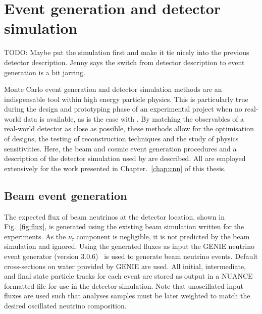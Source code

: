 \section{Event generation and detector simulation} %
\label{sec:chips_monte_carlo} %

TODO: Maybe put the simulation first and make it tie nicely into the previous detector
description. Jenny says the switch from detector description to event generation is a bit jarring.

Monte Carlo event generation and detector simulation methods are an indispensable tool within high
energy particle physics. This is particularly true during the design and prototyping phase of an
experimental project when no real-world data is available, as is the case with \chips. By matching
the observables of a real-world detector as close as possible, these methods allow for the
optimisation of designs, the testing of reconstruction techniques and the study of physics
sensitivities. Here, the beam and cosmic event generation procedures and a description of the
detector simulation used by \chips are described. All are employed extensively for the work
presented in Chapter.~\ref{chap:cnn} of this thesis.

\subsection{Beam event generation} %
\label{sec:chips_monte_carlo_beam} %

The expected flux of beam neutrinos at the \chipsfive detector location, shown in
Fig.~\ref{fig:flux}, is generated using the existing beam simulation written for the \numi
experiments. As the $\nu_{\tau}$ component is negligible, it is not predicted by the beam
simulation and ignored. Using the generated fluxes as input the GENIE neutrino event generator
(version 3.0.6)~\cite{andreopoulos2009, andreopoulos2015} is used to generate beam neutrino
events. Default cross-sections on water provided by GENIE are used. All initial, intermediate, and
final state particle tracks for each event are stored as output in a NUANCE formatted file for use
in the detector simulation. Note that unoscillated input fluxes are used such that analyses
samples must be later weighted to match the desired oscillated neutrino composition.

